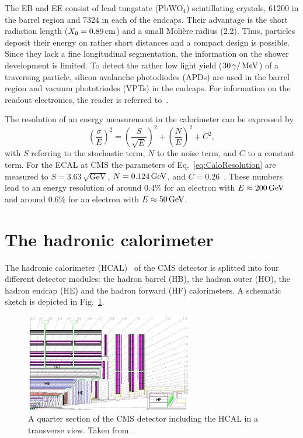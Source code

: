 The EB and EE consist of lead tungstate (PbWO$_4$) scintillating crystals, 61200 in the barrel region and 7324 in each of the endcaps. 
Their advantage is the short radiation length ($X_0=0.89\,\text{cm}$) and a small Moli\`ere radius (2.2\cm).
Thus, particles deposit their energy on rather short distances and a compact design is possible.
Since they lack a fine longitudinal segmentation, the information on the shower development is limited.
To detect the rather low light yield ($30\,\gamma/\,\text{Me}\kern-0.06667em\text{V}$) of a traversing particle, silicon avalanche photodiodes (APDs) are used in the barrel region and vacuum  phototriodes (VPTs) in the endcaps.
For information on the readout electronics, the reader is referred to~\cite{bib:CMS:TDR_2006}.

The resolution of an energy measurement in the calorimeter can be expressed by 
\begin{equation}
\label{eq:CaloResolution}
\left( \frac{\sigma}{E} \right)^2 = \left( \frac{S}{\sqrt{E}} \right)^2 + \left( \frac{N}{E} \right)^2 +C^2,
\end{equation}
with $S$ referring to the stochastic term, $N$ to the noise term, and $C$ to a constant term.
For the ECAL at CMS the parameters of Eq.~\eqref{eq:CaloResolution} are measured to $S=3.63\,\sqrt{\text{GeV}}$, $N=0.124\,\text{Ge}\kern-0.06667em\text{V}$, and $C=0.26$~\cite{bib:CMS:TDR_2006}. 
These numbers lead to an energy resolution of around 0.4\% for an electron with $E \approx 200\,\text{Ge}\kern-0.06667em\text{V}$ and around 0.6\% for an electron with $E \approx 50\,\text{Ge}\kern-0.06667em\text{V}$.

\section{The hadronic calorimeter}
The hadronic calorimeter (HCAL)~\cite{bib:CMS:TDR_2006,bib:CMS:TDR_HCAL} of the CMS detector is splitted into four different detector modules: the hadron barrel (HB), the hadron outer (HO), the hadron endcap (HE) and the hadron forward (HF) calorimeters.
A schematic sketch is depicted in Fig.~\ref{fig:HCAL}.
\begin{figure}[!b]
  \centering
      \includegraphics[width=0.65\textwidth]{figures/experiment/CMS/fig_HCALdiagram_smaller_size.png}
  \caption{A quarter section of the CMS detector including the HCAL in a transverse view. Taken from~\cite{bib:CMS:experiment}.}  
  \label{fig:HCAL}
\end{figure}

